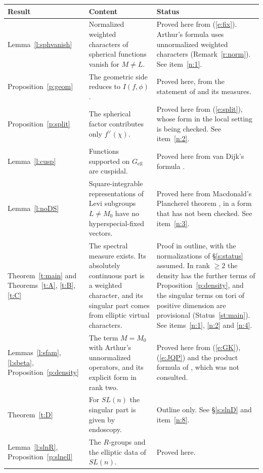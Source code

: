 \documentclass[12pt,letterpaper]{article}
\numberwithin{equation}{section}
\theoremstyle{plain}
\theoremstyle{definition}
\theoremstyle{remark}
\newcommand{\ellr}{\mathrm{ell}}
\begin{document}
\begin{center}\small
\begin{tabular}{@{}>{\raggedright\arraybackslash}p{}>{\raggedright\arraybackslash}p{}>{\raggedright\arraybackslash}p{}@{}}
\toprule
Result & Content & Status\\
\midrule
Lemma~\ref{l:sphvanish} & Normalized weighted characters of spherical functions vanish for $M\ne L$. & Proved here from (\ref{e:fix}). Arthur's formula uses unnormalized weighted characters (Remark~\ref{r:norm}). See item~\ref{n:1}.\\[0.5ex]
Proposition~\ref{p:geom} & The geometric side reduces to $I(f,\phi)$. & Proved here, from the statement of \cite[Thm.~12.2]{Ar91} and its measures.\\[0.5ex]
Proposition~\ref{p:split} & The spherical factor contributes only $f^\vee(\chi)$. & Proved here from (\ref{e:split}), whose form in the local setting is being checked. See item~\ref{n:2}.\\[0.5ex]
Lemma~\ref{l:cusp} & Functions supported on $G_{\ellr}$ are cuspidal. & Proved here from van Dijk's formula \cite{vD72}.\\[0.5ex]
Lemma~\ref{l:noDS} & Square-integrable representations of Levi subgroups $L\ne M_0$ have no hyperspecial-fixed vectors. & Proved here from Macdonald's Plancherel theorem \cite{Ma71}, in a form that has not been checked. See item~\ref{n:3}.\\[0.5ex]
Theorem~\ref{t:main} and Theorems~\ref{t:A}, \ref{t:B}, \ref{t:C} & The spectral measure exists. Its absolutely continuous part is a weighted character, and its singular part comes from elliptic virtual characters. & Proof in outline, with the normalizations of \S\ref{s:status} assumed. In rank $\ge2$ the density has the further terms of Proposition~\ref{p:density}, and the singular terms on tori of positive dimension are provisional (Status~\ref{st:main}). See items~\ref{n:1}, \ref{n:2} and \ref{n:4}.\\[0.5ex]
Lemmas~\ref{l:sfam}, \ref{l:sbeta}, Proposition~\ref{p:density} & The term $M=M_0$ with Arthur's unnormalized operators, and its explicit form in rank two. & Proved here from (\ref{e:GK}), (\ref{e:JQP}) and the product formula of \cite{Ar81}, which was not consulted.\\[0.5ex]
Theorem~\ref{t:D} & For $SL(n)$ the singular part is given by endoscopy. & Outline only. See \S\ref{s:slnD} and item~\ref{n:8}.\\[0.5ex]
Lemma~\ref{l:slnR}, Proposition~\ref{p:slnell} & The $R$-groups and the elliptic data of $SL(n)$. & Proved here.\\[0.5ex]

\end{tabular}
\end{center}
\end{document}
